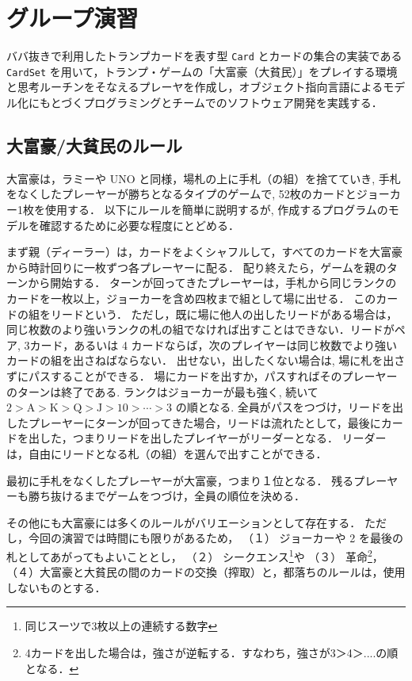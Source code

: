 \medskip

\section{グループ演習}
ババ抜きで利用したトランプカードを表す型 \verb+Card+ とカードの集合の実装である \verb+CardSet+ を用いて，トランプ・ゲームの「大富豪（大貧民）」をプレイする環境と思考ルーチンをそなえるプレーヤを作成し，オブジェクト指向言語によるモデル化にもとづくプログラミングとチームでのソフトウェア開発を実践する．

\subsection{大富豪/大貧民のルール}
大富豪は，ラミーや UNO と同様，場札の上に手札（の組）を捨てていき, 手札をなくしたプレーヤーが勝ちとなるタイプのゲームで, 52枚のカードとジョーカー1枚を使用する．
以下にルールを簡単に説明するが, 作成するプログラムのモデルを確認するために必要な程度にとどめる．  

まず親（ディーラー）は，カードをよくシャフルして，すべてのカードを大富豪から時計回りに一枚ずつ各プレーヤーに配る．
配り終えたら，ゲームを親のターンから開始する．
ターンが回ってきたプレーヤーは，手札から同じランクのカードを一枚以上，ジョーカーを含め四枚まで組として場に出せる．
このカードの組をリードという．
ただし，既に場に他人の出したリードがある場合は，同じ枚数のより強いランクの札の組でなければ出すことはできない．リードがペア, 3カード，あるいは 4 カードならば，次のプレイヤーは同じ枚数でより強いカードの組を出さねばならない．
出せない，出したくない場合は, 場に札を出さずにパスすることができる．
場にカードを出すか，パスすればそのプレーヤーのターンは終了である. 
ランクはジョーカーが最も強く, 続いて $2 > \mathrm{A} > \mathrm{K} > \mathrm{Q} > \mathrm{J} > 10 > \cdots > 3$ の順となる. 
全員がパスをつづけ，リードを出したプレーヤーにターンが回ってきた場合，リードは流れたとして，最後にカードを出した，つまりリードを出したプレイヤーがリーダーとなる．
リーダーは，自由にリードとなる札（の組）を選んで出すことができる．

最初に手札をなくしたプレーヤーが大富豪，つまり１位となる．
残るプレーヤーも勝ち抜けるまでゲームをつづけ，全員の順位を決める．

その他にも大富豪には多くのルールがバリエーションとして存在する．
ただし，今回の演習では時間にも限りがあるため，
（１） ジョーカーや 2 を最後の札としてあがってもよいこととし，
（２） シークエンス\footnote{同じスーツで3枚以上の連続する数字}や
（３） 革命\footnote{4カードを出した場合は，強さが逆転する．すなわち，強さが3＞4＞....の順となる．}，
（４）大富豪と大貧民の間のカードの交換（搾取）と，都落ちのルールは，使用しないものとする．


